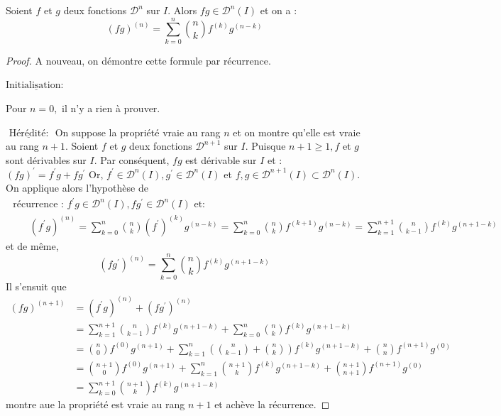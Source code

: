 \documentclass[12pt]{book}
\theoremstyle{definition}\newtheorem{dfn}{Définition}[chapter]
\theoremstyle{plain}\newtheorem{thm}{Théorème}[chapter]
\theoremstyle{plain}\newtheorem{prp}{Proposition}[chapter]
\theoremstyle{plain}\newtheorem{lem}{\bf Lemme}[chapter]
\theoremstyle{plain}\newtheorem{axm}{\bf Axiome}[chapter]
\theoremstyle{plain}\newtheorem{lmm}{\bf Lemme}[chapter]
\theoremstyle{plain}\newtheorem{cor}{\bf Corollaire}[chapter]
\theoremstyle{remark}\newtheorem{rem}{Remarque}[chapter]
\begin{document}
Soient $f$ et $g$ deux fonctions $\mathcal{D}^{n}$ sur $I$. Alors $f g \in \mathcal{D}^{n}(I)$ et on a :
$$\boxed{(fg)^{(n)}=\sum\limits_{k=0}^{n}\binom{n}{k} f^{(k)} g^{(n-k)}}$$
\begin{proof}
A nouveau, on démontre cette formule par récurrence. 

$\underline{\text {Initialisation: }}$

Pour $n=0,$ il n'y a rien à prouver.

$\underline{\text { Hérédité: }}$
On suppose la propriété vraie au rang $n$ et on montre qu'elle est vraie au rang $n+1 .$ Soient $f$ et $g$ deux fonctions $\mathcal{D}^{n+1}$ sur $I$. Puisque $n+1 \geqslant 1, f$ et $g$ sont dérivables sur $I .$ Par conséquent, $f g$ est 
dérivable sur $I$ et :
$(f g)^{\prime}=f^{\prime} g+f g^{\prime}$
Or, $f^{\prime} \in \mathcal{D}^{n}(I), g^{\prime} \in \mathcal{D}^{n}(I)$ et $f, g \in \mathcal{D}^{n+1}(I) \subset \mathcal{D}^{n}(I)$. On applique alors l'hypothèse de
$$
\begin{array}{l}
\text { récurrence : } f^{\prime} g \in \mathcal{D}^{n}(I), f g^{\prime} \in \mathcal{D}^{n}(I) \text { et: } \\
\qquad\left(f^{\prime} g\right)^{(n)}=\sum\limits_{k=0}^{n}\binom{n}{k}\left(f^{\prime}\right)^{(k)} g^{(n-k)}=\sum\limits_{k=0}^{n}\binom{n}{k}f^{(k+1)} g^{(n-k)}=\sum\limits_{k=1}^{n+1}\binom{n}{k-1}f^{(k)} g^{(n+1-k)}
\end{array}
$$
et de même,
$$
\left(f g^{\prime}\right)^{(n)}=\sum_{k=0}^{n}\binom{n}{k}f^{(k)} g^{(n+1-k)}
$$
Il s'ensuit que
$$
\begin{aligned}
(f g)^{(n+1)} &=\left(f^{\prime} g\right)^{(n)}+\left(f g^{\prime}\right)^{(n)} \\
&=\sum_{k=1}^{n+1}\binom{n}{k-1} f^{(k)} g^{(n+1-k)}+\sum_{k=0}^{n}\binom{n}{k}f^{(k)} g^{(n+1-k)} \\
&=\binom{n}{0}f^{(0)} g^{(n+1)}+\sum_{k=1}^{n}\left(\binom{n}{k-1}+\binom{n}{k}\right) f^{(k)} g^{(n+1-k)}+\binom{n}{n}
f^{(n+1)} g^{(0)} \\
&=\binom{n+1}{0}f^{(0)} g^{(n+1)}+\sum_{k=1}^{n}\binom{n+1}{k}f^{(k)} g^{(n+1-k)}+\binom{n+1}{n+1}f^{(n+1)} g^{(0)} \\
&=\sum_{k=0}^{n+1}\binom{n+1}{k}f^{(k)} g^{(n+1-k)}
\end{aligned}
$$
montre aue la propriété est vraie au rang $n+1$ et achève la récurrence.

\end{proof}
\end{document}
